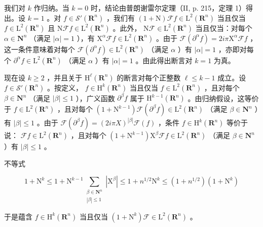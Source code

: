 我们对 \(k\) 作归纳。当 \(k = 0\) 时，结论由普朗谢雷尔定理（II, p. 215，定理 1）得出。设 \(k = 1\) 。对 \(f \in \mathcal{S}'(\mathbf{R}^n)\) ，我们有 \((1 + \mathrm{N})\mathcal{F}f \in \mathrm{L}^2(\mathbf{R}^n)\) 当且仅当 \(f \in \mathrm{L}^2(\mathbf{R}^n)\) 且 \(\mathrm{N}\mathcal{F}f \in \mathrm{L}^2(\mathbf{R}^n)\) 。此外， \(\mathrm{N}\mathcal{F} \in \mathrm{L}^2(\mathbf{R}^n)\) 当且仅当：对每个 \(\alpha \in \mathbf{N}^n\) （满足 \(|\alpha| = 1\) ），有 \(\mathrm{X}^\alpha\mathcal{F}f \in \mathrm{L}^2(\mathbf{R}^n)\) 。由于 \(\mathcal{F}(\partial^\alpha f) = 2i\pi\mathrm{X}^\alpha\mathcal{F}f\) ，这一条件意味着对每个 \(\mathcal{F}(\partial^\alpha f) \in \mathrm{L}^2(\mathbf{R}^n)\) （满足 \(\alpha\) ）有 \(|\alpha| = 1\) ，亦即对每个 \(\partial^\alpha f \in \mathrm{L}^2(\mathbf{R}^n)\) （满足 \(\alpha\) ）有 \(|\alpha| = 1\) 。由此得出断言对 \(k = 1\) 为真。

现在设 \(k \geqslant 2\) ，并且关于 \(\mathrm{H}^{\ell}(\mathbf{R}^{n})\) 的断言对每个正整数 \(\ell \leqslant k - 1\) 成立。设 \(f \in \mathcal{S}'(\mathbf{R}^{n})\) 。按定义， \(f \in \mathrm{H}^{k}(\mathbf{R}^{n})\) 当且仅当 \(f \in \mathrm{L}^{2}(\mathbf{R}^{n})\) ，且对每个 \(\beta \in \mathbf{N}^{n}\) （满足 \(|\beta| \leqslant 1\) ），广义函数 \(\partial^{\beta} f\) 属于 \(\mathrm{H}^{k-1}(\mathbf{R}^{n})\) 。由归纳假设，这等价于 \(f \in \mathrm{L}^{2}(\mathbf{R}^{n})\) ，且对每个 \((1 + \mathrm{N}^{k-1})\mathcal{F}(\partial^{\beta} f) \in \mathrm{L}^{2}(\mathbf{R}^{n})\) （满足 \(\beta \in \mathbf{N}^{n}\) ）有 \(|\beta| \leqslant 1\) 。由于 \(\mathcal{F}(\partial^{\beta} f) = (2i\pi X)^{|\beta|}\mathcal{F}(f)\) ，条件 \(f \in \mathrm{H}^{k}(\mathbf{R}^{n})\) 等价于说： \(\mathcal{F}f \in \mathrm{L}^{2}(\mathbf{R}^{n})\) ，且对每个 \((1 + \mathrm{N}^{k-1})\mathrm{X}^{\beta}\mathcal{F}f \in \mathrm{L}^{2}(\mathbf{R}^{n})\) （满足 \(\beta \in \mathbf{N}^{n}\) ）有 \(|\beta| \leqslant 1\) 。

不等式

\[
1 + \mathrm{N}^{k}\leqslant 1 + \mathrm{N}^{k - 1}\sum_{\substack{\beta \in \mathbf{N}^{n}\\ |\beta |\leqslant 1}}|\mathrm{X}^{\beta}|\leqslant 1 + n^{1 / 2}\mathrm{N}^{k}\leqslant (1 + n^{1 / 2})(1 + \mathrm{N}^{k})
\]

于是蕴含 \(f \in \mathrm{H}^k(\mathbf{R}^n)\) 当且仅当 \((1 + \mathrm{N}^k)\mathcal{F} \in \mathrm{L}^2(\mathbf{R}^n)\) 。

